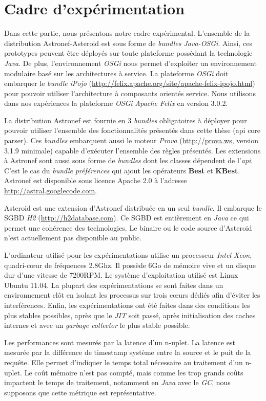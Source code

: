 \section{Cadre d'expérimentation}\label{sec:valid:perfs:cadre}
Dans cette partie, nous présentons notre cadre expérimental. L'ensemble de la distribution Astronef-Asteroid est sous forme de \textit{bundles Java-OSGi}. Ainsi, ces prototypes peuvent être déployés sur toute plateforme possédant la technologie \textit{Java}. De plus, l'environnement \textit{OSGi} nous permet d'exploiter un environnement modulaire basé sur les architectures à service. La plateforme \textit{OSGi} doit embarquer le \textit{bundle} \textit{iPojo} (\url{http://felix.apache.org/site/apache-felix-ipojo.html}) pour pouvoir utiliser l'architecture à composants orientés service. Nous utilisons dans nos expériences la plateforme \textit{OSGi} \textit{Apache Felix} en version 3.0.2.

La distribution Astronef est fournie en 3 \textit{bundles} obligatoires à déployer pour pouvoir utiliser l'ensemble des fonctionnalités présentés dans cette thèse (api core parser). Ces \textit{bundles} embarquent aussi le moteur \textit{Prova} (\url{http://prova.ws}, version 3.1.9 minimale) capable d'exécuter l'ensemble des règles présentés. Les extensions à Astronef sont aussi sous forme de \textit{bundles} dont les classes dépendent de l'\textit{api}. C'est le cas du \textit{bundle} \textit{préférences} qui ajout les opérateurs \textbf{Best} et \textbf{KBest}. Astronef est disponible sous licence Apache 2.0 à l'adresse \url{http://astral.googlecode.com}.

Asteroid est une extension d'Astronef distribuée en un seul \textit{bundle}. Il embarque le SGBD \textit{H2} (\url{http://h2database.com}). Ce SGBD est entièrement en \textit{Java} ce qui permet une cohérence des technologies. Le binaire ou le code source d'Asteroid n'est actuellement pas disponible au public.

L'ordinateur utilisé pour les expérimentations utilise un processeur \textit{Intel Xeon}, quadri-cœur de fréquences 2.8Ghz. Il possède 6Go de mémoire vive et un disque dur d'une vitesse de 7200RPM. Le système d'exploitation utilisé est Linux Ubuntu 11.04. La plupart des expérimentations se sont faites dans un environnement clôt en isolant les processus sur trois cœurs dédiés afin d'éviter les interférences. Enfin, les expérimentations ont été faites dans des conditions les plus stables possibles, après que le \textit{JIT} soit passé, après initialisation des caches internes et avec un \textit{garbage collector} le plus stable possible.

Les performances sont mesurés par la latence d'un n-uplet. La latence est mesurée par la différence de timestamp système entre la source et le puit de la requête. Elle permet d'indiquer le temps total nécessaire au traitement d'un n-uplet. Le coût mémoire n'est pas compté, mais comme les trop grands coûts impactent le temps de traitement, notamment en \textit{Java} avec le \textit{GC}, nous supposons que cette métrique est représentative.
